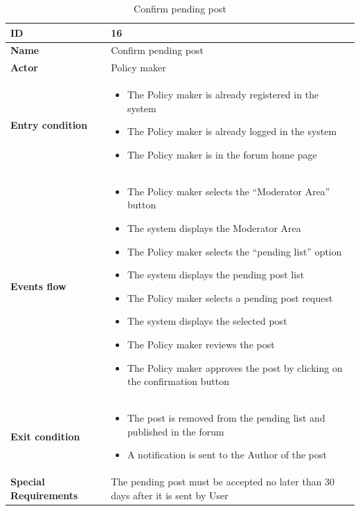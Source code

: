     \begin{longtable}{p{} | p{}}
     \caption{Confirm pending post}
        \label{tab:Confirm_pending_post}\\
        \hline
        \textbf{ID} & 16\\
        \hline
        \textbf{Name}  &  Confirm pending post\\
        \hline
        \textbf{Actor}  &  Policy maker\\
        \hline
        \textbf{Entry condition}  &  
        \begin{itemize}
                \item The Policy maker is already registered in the system
                \item The Policy maker is already logged in the system
                \item The Policy maker is in the forum home page
         \end{itemize}\\
        \hline
        \textbf{Events flow} & 
        \begin{itemize}
                \item The Policy maker selects the “Moderator Area” button
                \item The system displays the Moderator Area
                \item The Policy maker selects the “pending list” option
                \item The system displays the pending post list
                \item The Policy maker selects a pending post request
                \item The system displays the selected post
                \item The Policy maker reviews the post
                \item The Policy maker approves the post by clicking on the confirmation button
                 \end{itemize}
                 \\
        \hline
        \textbf{Exit condition} &
        \begin{itemize}
                \item The post is removed from the pending list and published in the forum
                \item A notification is sent to the Author of the post
                \end{itemize}
                \\
        \hline
        \textbf{Special Requirements} & The pending post must be accepted no later than 30 days after it is sent by User\\
        \hline
       
       
    \end{longtable}
    

